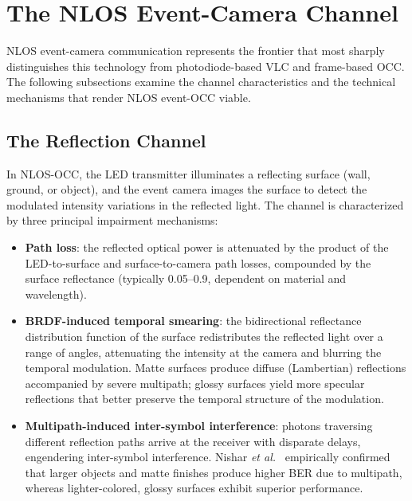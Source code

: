 \documentclass[10pt,a4paper]{article}
\begin{document}
\section{The NLOS Event-Camera Channel}
\label{sec:nlos}

NLOS event-camera communication represents the frontier that most
sharply distinguishes this technology from photodiode-based VLC and
frame-based OCC. The following subsections examine the channel
characteristics and the technical mechanisms that render NLOS event-OCC
viable.

\subsection{The Reflection Channel}
\label{sec:reflection}

In NLOS-OCC, the LED transmitter illuminates a reflecting surface (wall,
ground, or object), and the event camera images the surface to detect
the modulated intensity variations in the reflected light. The channel
is characterized by three principal impairment mechanisms:
\begin{itemize}
  \item \textbf{Path loss}: the reflected optical power is attenuated by
    the product of the LED-to-surface and surface-to-camera path losses,
    compounded by the surface reflectance (typically 0.05--0.9, dependent
    on material and wavelength).
  \item \textbf{BRDF-induced temporal smearing}: the bidirectional
    reflectance distribution function of the surface redistributes the
    reflected light over a range of angles, attenuating the intensity at
    the camera and blurring the temporal modulation. Matte surfaces
    produce diffuse (Lambertian) reflections accompanied by severe
    multipath; glossy surfaces yield more specular reflections that
    better preserve the temporal structure of the modulation.
  \item \textbf{Multipath-induced inter-symbol interference}: photons
    traversing different reflection paths arrive at the receiver with
    disparate delays, engendering inter-symbol interference. Nishar
    \emph{et al.}~\cite{nishar2025nlosneuromorphic} empirically confirmed
    that larger objects and matte finishes produce higher BER due to
    multipath, whereas lighter-colored, glossy surfaces exhibit superior
    performance.
\end{itemize}
\end{document}
